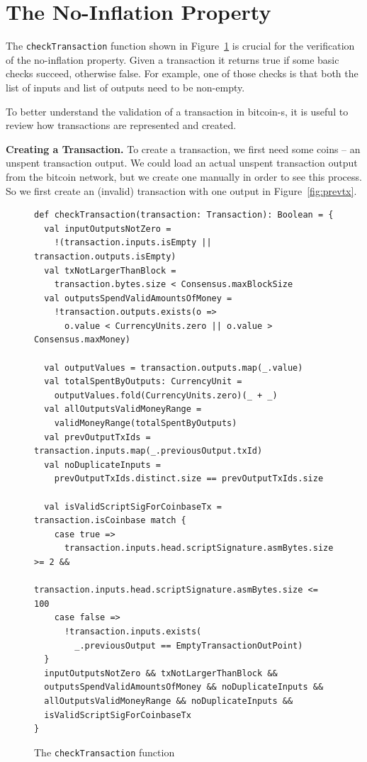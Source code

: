 \documentclass[runningheads]{llncs}
\renewcommand{\paragraph}{\textbf}%
\begin{document}
\section{The No-Inflation Property}


The \texttt{checkTransaction} function shown in
Figure~\ref{fig:checktrans} is crucial for the verification of the
no-inflation property. Given a transaction it returns true if some
basic checks succeed, otherwise false. For example, one of those
checks is that both the list of inputs and list of outputs need to be
non-empty.

To better understand the validation of a transaction in bitcoin-s, it
is useful to review how transactions are represented and created.

\paragraph{Creating a Transaction.} To create a transaction, we first
need some coins -- an unspent transaction output. We could load an
actual unspent transaction output from the bitcoin network, but we
create one manually in order to see this process. So we first create
an (invalid) transaction with one output in Figure~\ref{fig:prevtx}.

\begin{figure}
\begin{lstlisting}[style=scala]
def checkTransaction(transaction: Transaction): Boolean = {
  val inputOutputsNotZero =
    !(transaction.inputs.isEmpty || transaction.outputs.isEmpty)
  val txNotLargerThanBlock = 
    transaction.bytes.size < Consensus.maxBlockSize
  val outputsSpendValidAmountsOfMoney = 
    !transaction.outputs.exists(o =>
      o.value < CurrencyUnits.zero || o.value > Consensus.maxMoney)

  val outputValues = transaction.outputs.map(_.value)
  val totalSpentByOutputs: CurrencyUnit =
    outputValues.fold(CurrencyUnits.zero)(_ + _)
  val allOutputsValidMoneyRange = 
    validMoneyRange(totalSpentByOutputs)
  val prevOutputTxIds = transaction.inputs.map(_.previousOutput.txId)
  val noDuplicateInputs = 
    prevOutputTxIds.distinct.size == prevOutputTxIds.size

  val isValidScriptSigForCoinbaseTx = transaction.isCoinbase match {
    case true =>
      transaction.inputs.head.scriptSignature.asmBytes.size >= 2 &&
        transaction.inputs.head.scriptSignature.asmBytes.size <= 100
    case false =>
      !transaction.inputs.exists(
        _.previousOutput == EmptyTransactionOutPoint)
  }
  inputOutputsNotZero && txNotLargerThanBlock && 
  outputsSpendValidAmountsOfMoney && noDuplicateInputs &&
  allOutputsValidMoneyRange && noDuplicateInputs && 
  isValidScriptSigForCoinbaseTx
}
\end{lstlisting}
  
  \caption{The \texttt{checkTransaction} function}
  \label{fig:checktrans}
\end{figure}
\end{document}
